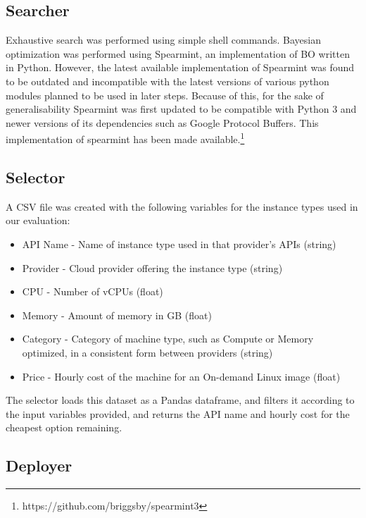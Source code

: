 \documentclass{article}
\begin{document}
\subsection{Searcher}
Exhaustive search was performed using simple shell commands. Bayesian optimization was performed using Spearmint, an implementation of BO written in Python. However, the latest available implementation of Spearmint was found to be outdated and incompatible with the latest versions of various python modules planned to be used in later steps. 
Because of this, for the sake of generalisability Spearmint was first updated to be compatible with Python 3 and newer versions of its dependencies such as Google Protocol Buffers. This implementation of spearmint has been made available.\footnote{https://github.com/briggsby/spearmint3}

\subsection{Selector}
A CSV file was created with the following variables for the instance types used in our evaluation:

\begin{itemize}
\item API Name - Name of instance type used in that provider's APIs (string)
\item Provider - Cloud provider offering the instance type (string)
\item CPU - Number of vCPUs (float)
\item Memory - Amount of memory in GB (float)
\item Category - Category of machine type, such as Compute or Memory optimized, in a consistent form between providers (string) 	
\item Price - Hourly cost of the machine for an On-demand Linux image (float)
\end{itemize}

The selector loads this dataset as a Pandas dataframe, and filters it according to the input variables provided, and returns the API name and hourly cost for the cheapest option remaining.

\subsection{Deployer}
\end{document}

